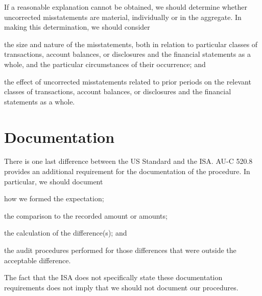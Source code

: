If a reasonable explanation cannot be obtained, we should determine whether uncorrected misstatements are material, individually or in the aggregate. In making this determination, we should consider 

\begin{compactitem}
\item the size and nature of the misstatements, both in relation to particular classes of transactions, account balances, or disclosures and the financial statements as a whole, and the particular circumstances of their occurrence; and 
\item the effect of uncorrected misstatements related to prior periods on the relevant classes of transactions, account balances, or disclosures and the financial statements as a whole.
\end{compactitem}


\section{Documentation} %
\label{sec:documentation}

There is one last difference between the US Standard and the ISA. AU-C 520.8 provides an additional requirement for the documentation of the procedure. In particular, we should document 
\begin{compactitem}
\item how we formed the expectation;
\item the comparison to the recorded amount or amounts;
\item the calculation of the difference(s); and 
\item the audit procedures performed for those differences that were outside the acceptable difference. 
\end{compactitem}

The fact that the ISA does not specifically state these documentation requirements does not imply that we should not document our procedures. 




